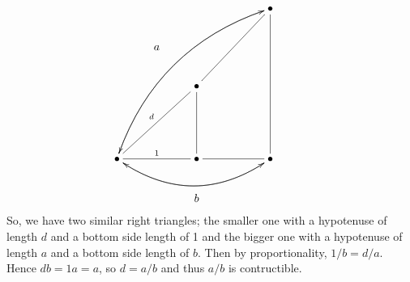 \documentclass[12pt]{article}
\begin{document}
\begin{enumerate}
\begin{enumerate}
\begin{displaymath}
\xymatrix{
&&&&\bullet \ar@/_2pc/[ddddllll]&\\
&a&&& &\\
&&\bullet \ar@{-}[uurr]&& &\\
&&&& &\\
\bullet \ar@/^2pc/[uuuurrrr] \ar@{-}[uurr]^d \ar@{-}[rr]^1 \ar@/_2pc/[rrrr] &&
\bullet \ar@{-}[rr] \ar@{-}[uu] &&\ar@{-}[uuuu]\bullet \ar@/^2pc/[llll] &\\
&&b&& &\\
}
\end{displaymath}
\[ \]
\[ \]
So, we have two similar right triangles; 
the smaller one with a hypotenuse of length $d$ and a 
bottom side length of 1 and the bigger one with a
hypotenuse of length $a$ and a bottom side length of $b$. Then by proportionality,
$1/b = d/a$. Hence $db = 1a = a$, so $d = a/b$ and thus $a/b$ is contructible. 
\end{enumerate}



\end{enumerate}
\end{document}
